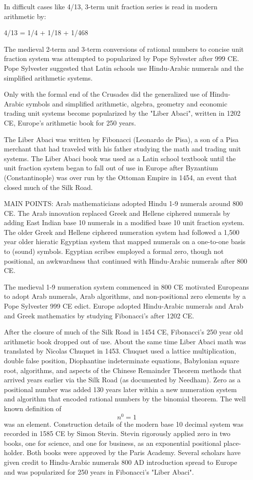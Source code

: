 \documentclass[12pt]{article}
\begin{document}
In difficult cases like 4/13, 3-term unit fraction series is read in modern arithmetic by:

4/13 = 1/4 + 1/18 + 1/468  

The medieval 2-term and 3-term conversions of rational numbers to concise unit fraction system was attempted to  popularized by Pope Sylvester after 999 CE. Pope Sylvester suggested that Latin schools  use Hindu-Arabic numerals and the simplified arithmetic systems. 

Only with the formal end of the Crusades did the generalized use of  Hindu-Arabic symbols and simplified arithmetic, algebra, geometry and economic trading unit systems become popularized by the "Liber Abaci", written in 1202 CE, Europe's arithmetic book for 250 years.

The Liber Abaci was written by Fibonacci (Leonardo de Pisa), a son of a Pisa merchant that had traveled with his father studying the math and trading unit systems. The Liber Abaci book was used as a Latin school textbook until the unit fraction system began to fall out of use in Europe after Byzantium (Constantinople) was over run by the Ottoman Empire in 1454, an event that closed much of the Silk Road.

MAIN POINTS: Arab mathematicians adopted Hindu 1-9 numerals around 800 CE. The Arab innovation replaced Greek and Hellene ciphered numerals by adding East Indian base 10 numerals in a modified base 10 unit fraction system. The older Greek and Hellene ciphered numeration system had followed a 1,500 year older hieratic Egyptian system that mapped numerals on a one-to-one basis to (sound) symbols. Egyptian scribes employed a formal zero, though not positional, an awkwardness that continued with Hindu-Arabic numerals after 800 CE. 

The medieval 1-9 numeration system commenced in 800 CE motivated Europeans to adopt Arab numerals, Arab algorithms, and non-positional zero elements by a Pope Sylvester 999 CE edict. Europe adopted Hindu-Arabic numerals and Arab and Greek mathematics by studying Fibonacci's  after 1202 CE. 

After the closure of much of  the Silk Road in 1454 CE, Fibonacci's 250 year old arithmetic book dropped out of use. About the same time Liber Abaci math was translated by Nicolas Chuquet in 1453. Chuquet used a lattice multiplication, double false position, Diophantine indeterminate equations, Babylonian square root, algorithms, and aspects of the Chinese Remainder Theorem methods that arrived years earlier via the Silk Road (as documented by Needham). Zero as a positional number was added 130 years later within a new numeration system and algorithm that encoded rational numbers by the binomial theorem. The well known definition of $$n^0 = 1$$ was an element. Construction details of the modern base 10 decimal system was recorded in 1585 CE by Simon Stevin. Stevin rigorously applied zero in two books, one for science, and one for business, as an exponential positional place-holder. Both books were approved by the Paris Academy. Several scholars have given credit to Hindu-Arabic numerals 800 AD introduction spread to Europe and was popularized for 250 years in Fibonacci's "Liber Abaci".
\end{document}
